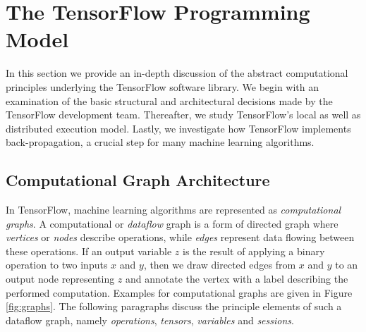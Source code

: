 \section{The TensorFlow Programming Model}\label{sec:model}

In this section we provide an in-depth discussion of the abstract computational
principles underlying the TensorFlow software library. We begin with an
examination of the basic structural and architectural decisions made by the
TensorFlow development team. Thereafter, we study TensorFlow's local as well as
distributed execution model. Lastly, we investigate how TensorFlow implements
back-propagation, a crucial step for many machine learning algorithms.

\subsection{Computational Graph Architecture}\label{sec:model-graphs}

In TensorFlow, machine learning algorithms are represented as
\emph{computational graphs}. A computational or \emph{dataflow} graph is a form
of directed graph where \emph{vertices} or \emph{nodes} describe operations,
while \emph{edges} represent data flowing between these operations. If an output
variable $z$ is the result of applying a binary operation to two inputs $x$ and
$y$, then we draw directed edges from $x$ and $y$ to an output node representing
$z$ and annotate the vertex with a label describing the performed
computation. Examples for computational graphs are given in Figure
\ref{fig:graphs}. The following paragraphs discuss the principle elements of
such a dataflow graph, namely \emph{operations}, \emph{tensors},
\emph{variables} and \emph{sessions}.

